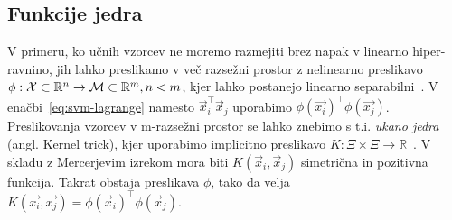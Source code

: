 \subsection{Funkcije jedra}
V primeru, ko učnih vzorcev ne moremo razmejiti brez napak v linearno hiper-ravnino, jih lahko preslikamo v več razsežni prostor z nelinearno preslikavo $\phi: \mathcal{X} \subset \mathbb{R}^n \to \mathcal{M} \subset \mathbb{R}^m, n < m$, kjer lahko postanejo linearno separabilni~\cite{chapelle1999support,boughorbel2005generalized}. V enačbi~\eqref{eq:svm-lagrange} namesto $\vec{x}_i^\top\vec{x}_j$ uporabimo $\phi(\vec{x_i})^\top\phi(\vec{x_j})$. Preslikovanja vzorcev v m-razsežni prostor se lahko znebimo s t.i. \emph{ukano jedra} (angl. Kernel trick), kjer uporabimo implicitno preslikavo $K: \mathcal{\Xi} \times \mathcal{\Xi} \to \mathbb{R}$~\cite{boughorbel2005generalized}. V skladu z Mercerjevim izrekom mora biti $K(\vec{x}_i,\vec{x}_j)$ simetrična in pozitivna funkcija. Takrat obstaja preslikava $\phi$, tako da velja $K(\vec{x_i}, \vec{x_j}) = \phi(\vec{x}_i)^\top\phi(\vec{x}_j)$.


